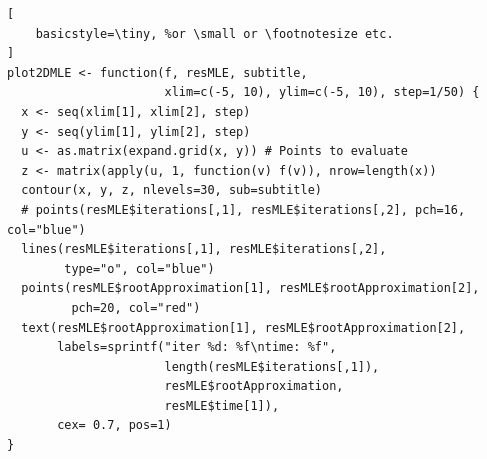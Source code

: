 \begin{appendices}
\begin{lstlisting}[
	basicstyle=\tiny, %or \small or \footnotesize etc.
]
plot2DMLE <- function(f, resMLE, subtitle, 
                      xlim=c(-5, 10), ylim=c(-5, 10), step=1/50) {
  x <- seq(xlim[1], xlim[2], step)
  y <- seq(ylim[1], ylim[2], step)
  u <- as.matrix(expand.grid(x, y)) # Points to evaluate
  z <- matrix(apply(u, 1, function(v) f(v)), nrow=length(x))
  contour(x, y, z, nlevels=30, sub=subtitle)
  # points(resMLE$iterations[,1], resMLE$iterations[,2], pch=16, col="blue")
  lines(resMLE$iterations[,1], resMLE$iterations[,2], 
        type="o", col="blue") 
  points(resMLE$rootApproximation[1], resMLE$rootApproximation[2],
         pch=20, col="red")
  text(resMLE$rootApproximation[1], resMLE$rootApproximation[2],
       labels=sprintf("iter %d: %f\ntime: %f", 
                      length(resMLE$iterations[,1]), 
                      resMLE$rootApproximation, 
                      resMLE$time[1]), 
       cex= 0.7, pos=1)
}
\end{lstlisting}

\end{appendices}

